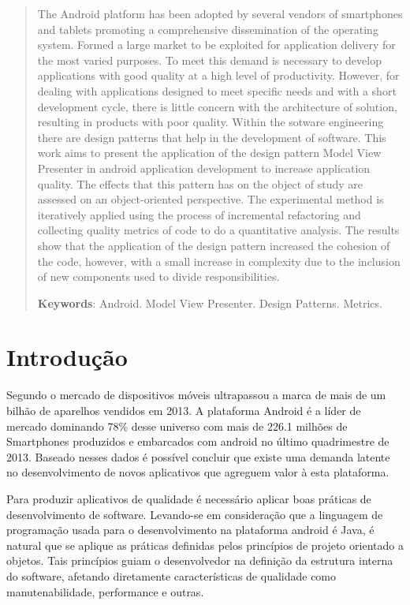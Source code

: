 \documentclass[conference]{IEEEtran}
\begin{document}
\begin{abstract}

The Android platform has been adopted by several vendors of smartphones and
tablets promoting a comprehensive dissemination of the operating system.
Formed a large market to be exploited for application delivery
for the most varied purposes. To meet this demand is necessary to
develop applications with good quality at a high level of productivity.
However, for dealing with applications designed to meet specific needs and with a
short development cycle, there is little concern with the architecture of
solution, resulting in products with poor quality. Within the sotware
engineering there are design patterns that help in the development of
software. This work aims to present the application of the design pattern
Model View Presenter in android application development to increase
application quality. The effects that this pattern has on the object of study
are assessed on an object-oriented perspective. The experimental method is
iteratively applied using the process of incremental refactoring and
collecting quality metrics of code to do a quantitative analysis.
The results show that the application of the design pattern increased the
cohesion of the code, however, with a small increase in complexity due to the
inclusion of new components used to divide responsibilities.


\noindent
\textbf{Keywords}: Android. Model View Presenter. Design Patterns. Metrics.

\end{abstract}

\section{Introdução}

Segundo \cite{idc} o mercado de dispositivos móveis ultrapassou a marca de mais de um
bilhão de aparelhos vendidos em 2013. A plataforma Android é a líder
de mercado dominando 78\% desse universo com mais de 226.1 milhões de
Smartphones produzidos e embarcados com android no último quadrimestre de 2013.
Baseado nesses dados é possível concluir que existe uma demanda latente no
desenvolvimento de novos aplicativos que agreguem valor à esta plataforma.

Para produzir aplicativos de qualidade é necessário aplicar boas práticas de
desenvolvimento de software. Levando-se em consideração que a linguagem de
programação usada para o desenvolvimento na plataforma android é Java, é
natural que se aplique as práticas definidas pelos princípios de projeto
orientado a objetos. Tais  princípios guiam o desenvolvedor na definição da
estrutura interna do software, afetando diretamente características  de
qualidade como manutenabilidade, performance e outras\cite{tempero-di}.
\end{document}
